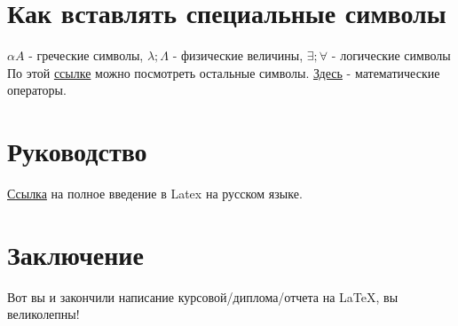 




% 




\section{Как вставлять специальные символы}
$\alpha A$ - греческие символы,  $ \lambda; \Lambda$ - физические величины, $\exists; \forall$ - логические символы\\
По этой   \href{https://www.overleaf.com/learn/latex/List_of_Greek_letters_and_math_symbols}{ссылке} можно посмотреть остальные символы. \href{https://www.overleaf.com/learn/latex/Operators}{Здесь} - математические операторы.



\section{Руководство}
\href{https://www.texlive.info/CTAN/info/lshort/russian/lshortru.pdf}{Ссылка} на полное введение в Latex на русском языке.


\newpage
\section{Заключение}
Вот вы и закончили написание курсовой/диплома/отчета на \LaTeX, вы великолепны!


